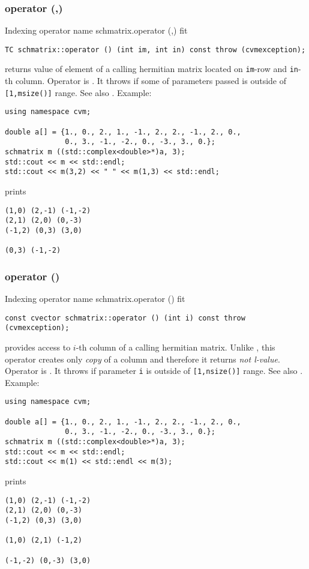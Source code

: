 \subsubsection{operator (,)}
Indexing operator%
\pdfdest name {schmatrix.operator (,)} fit
\begin{verbatim}
TC schmatrix::operator () (int im, int in) const throw (cvmexception);
\end{verbatim}
returns value of element of a calling hermitian matrix located on
\verb"im"-row and \verb"in"-th column. 
Operator is \Based.
It throws 
if some of parameters passed
is outside of \verb"[1,msize()]" range.
See also .
Example:
\begin{Verbatim}
using namespace cvm;

double a[] = {1., 0., 2., 1., -1., 2., 2., -1., 2., 0.,
              0., 3., -1., -2., 0., -3., 3., 0.};
schmatrix m ((std::complex<double>*)a, 3);
std::cout << m << std::endl;
std::cout << m(3,2) << " " << m(1,3) << std::endl;
\end{Verbatim}
prints
\begin{Verbatim}
(1,0) (2,-1) (-1,-2)
(2,1) (2,0) (0,-3)
(-1,2) (0,3) (3,0)

(0,3) (-1,-2)
\end{Verbatim}
\newpage




\subsubsection{operator ()}
Indexing operator%
\pdfdest name {schmatrix.operator ()} fit
\begin{verbatim}
const cvector schmatrix::operator () (int i) const throw (cvmexception);
\end{verbatim}
provides access to \hbox{$i$-th} column of a calling hermitian matrix.
Unlike ,
this operator creates only \emph{copy} of a column and therefore
it returns
\emph{not  l-value}.
Operator is \Based.
It throws 
if parameter \verb"i" is outside of \verb"[1,nsize()]" range.
See also .
Example:
\begin{Verbatim}
using namespace cvm;

double a[] = {1., 0., 2., 1., -1., 2., 2., -1., 2., 0.,
              0., 3., -1., -2., 0., -3., 3., 0.};
schmatrix m ((std::complex<double>*)a, 3);
std::cout << m << std::endl;
std::cout << m(1) << std::endl << m(3);
\end{Verbatim}
prints
\begin{Verbatim}
(1,0) (2,-1) (-1,-2)
(2,1) (2,0) (0,-3)
(-1,2) (0,3) (3,0)

(1,0) (2,1) (-1,2)

(-1,-2) (0,-3) (3,0)
\end{Verbatim}
\newpage



